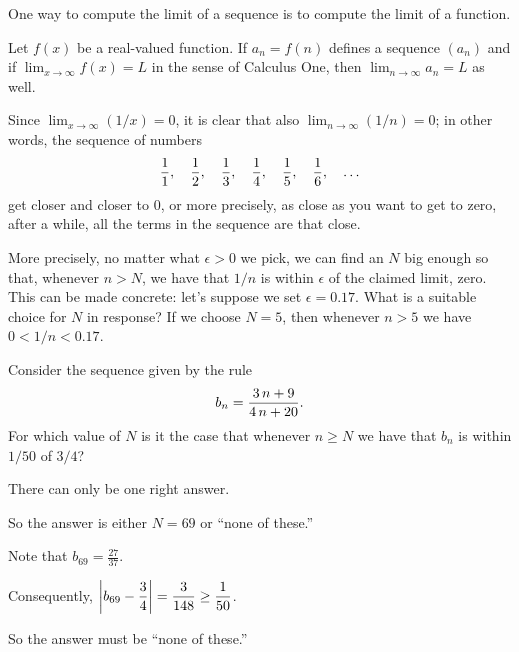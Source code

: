 \documentclass{ximera}
\begin{document}
One way to compute the limit of a sequence is to compute the limit of
a function.
\begin{theorem}
  \label{theorem:compute-limit-of-sequence-via-function}
  Let $f(x)$ be a real-valued function.  If $a_n = f(n)$ defines a
  sequence $(a_n)$ and if $\displaystyle\lim_{x\to\infty}f(x)=L$ in the sense of Calculus
  One, then $\displaystyle\lim_{n\to\infty} a_n=L$ as well.
\end{theorem}

\begin{example}
\label{example:find-n-for-epsilon}
Since $\displaystyle\lim_{x\to\infty}(1/x)=0$, it is
clear that also $\displaystyle\lim_{n\to\infty}(1/n)=0$; in other words, the sequence of numbers
$${1\over1},\quad {1\over2},\quad {1\over3},\quad {1\over4},\quad {1\over5},\quad {1\over6},\quad \ldots$$
get closer and closer to 0, or more precisely, as close as you want to get to zero, after a while, all the terms in the sequence are that close.

More precisely, no matter what $\epsilon > 0$ we pick, we can find an
$N$ big enough so that, whenever $n > N$, we have that $1/n$ is within
$\epsilon$ of the claimed limit, zero.  This can be made concrete:
let's suppose we set $\epsilon = 0.17$.  What is a suitable choice for
$N$ in response?  If we choose $N = 5$, then whenever $n > 5$ we have
$0 < 1/n < 0.17$.
\end{example}


\begin{question}
  Consider the sequence given by the rule \[b_{n} = \displaystyle\displaystyle\frac{ 3 \, n + 9 }{ 4 \, n + 20 }.\]  For which value of \(N\) is it the case that whenever \(n \geq N\) we have that \(b_{n}\) is within \(1/50\) of \(3/4\)?

    \begin{hint}
      There can only be one right answer.
    \end{hint}
    \begin{hint}
      So the answer is either \(N = 69\) or ``none of these.''
    \end{hint}
    \begin{hint}
      Note that \(b_{69} = \displaystyle\frac{27}{37}\).
    \end{hint}
    \begin{hint}
      Consequently, \(\left| b_{69} - \displaystyle \displaystyle\frac{3}{4} \right| = \displaystyle\frac{3}{148} \geq \displaystyle\frac{1}{50}\).
    \end{hint}
    \begin{hint}
      So the answer must be ``none of these.''
    \end{hint}

    \begin{multipleChoice}
    \end{multipleChoice}

\end{question}
\end{document}

